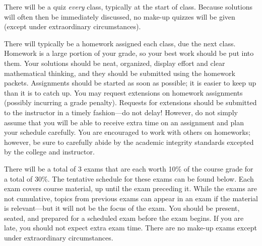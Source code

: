 \documentclass[11pt,letterpaper]{article}
\begin{document}
There will be a quiz \textit{every} class, typically at the start of class. Because solutions will often then be immediately discussed, no make-up quizzes will be given (except under extraordinary circumstances). \pspace


There will typically be a homework assigned each class, due the next class. Homework is a large portion of your grade, so your best work should be put into them. Your solutions should be neat, organized, display effort and clear mathematical thinking, and they should be submitted using the homework packets. Assignments should be started as soon as possible; it is easier to keep up than it is to catch up. You may request extensions on homework assignments (possibly incurring a grade penalty). Requests for extensions should be submitted to the instructor in a timely fashion---do not delay! However, do not simply assume that you will be able to receive extra time on an assignment and plan your schedule carefully. You are encouraged to work with others on homeworks; however, be sure to carefully abide by the academic integrity standards excepted by the college and instructor. \pspace


There will be a total of 3 exams that are each worth 10\% of the course grade for a total of 30\%. The tentative schedule for these exams can be found below. Each exam covers course material, up until the exam preceding it. While the exams are not cumulative, topics from previous exams can appear in an exam if the material is relevant---but it will not be the focus of the exam. You should be present, seated, and prepared for a scheduled exam before the exam begins. If you are late, you should not expect extra exam time. There are no make-up exams except under extraordinary circumstances. \pspace
\end{document}
